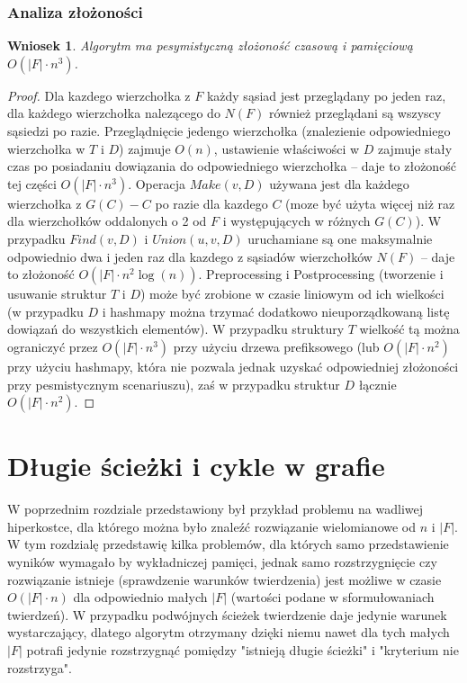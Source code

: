 \documentclass{pracamgr}
\newtheorem{corollary}[theorem]{Wniosek}
\begin{document}
   \subsection{Analiza złożoności}
   \begin{corollary}\label{zlozonosc lokalnej spojnosci}
    Algorytm ma pesymistyczną złożoność czasową i pamięciową $O(|F|\cdot n^3)$.
   \end{corollary}
   \begin{proof}
    Dla kazdego wierzchołka z $F$ każdy sąsiad jest przeglądany po jeden raz, dla każdego wierzchołka nalezącego do $N(F)$ również przeglądani są wszyscy sąsiedzi
    po razie. Przeglądnięcie jedengo wierzchołka (znalezienie odpowiedniego wierzchołka w $T$ i $D$) zajmuje $O(n)$,
    ustawienie właściwości w $D$ zajmuje stały czas po posiadaniu dowiązania do odpowiedniego wierzchołka -- daje to złożoność tej części $O(|F|\cdot n^3)$.\newline
    Operacja $Make(v,D)$ używana jest dla każdego wierzchołka z $G(C)-C$ po razie dla kazdego $C$
    (moze być użyta więcej niż raz dla wierzchołków oddalonych o 2 od $F$ i występujących w różnych $G(C)$).
    W przypadku $Find(v,D)$ i $Union(u,v,D)$ uruchamiane są one maksymalnie odpowiednio dwa i jeden raz dla kazdego z sąsiadów wierzchołków $N(F)$
    -- daje to złożoność $O(|F|\cdot n^2\log(n))$.\newline
    Preprocessing i Postprocessing (tworzenie i usuwanie struktur $T$ i $D$)
    może być zrobione w czasie liniowym od ich wielkości (w przypadku $D$ i hashmapy można trzymać dodatkowo nieuporządkowaną listę dowiązań do wszystkich
    elementów). W przypadku struktury $T$ wielkość tą można ograniczyć przez $O(|F|\cdot n^3)$ przy użyciu drzewa prefiksowego
    (lub $O(|F|\cdot n^2)$ przy użyciu hashmapy, która nie pozwala jednak uzyskać odpowiedniej złożoności przy pesmistycznym scenariuszu),
    zaś w przypadku struktur $D$ łącznie $O(|F|\cdot n^2)$.
   \end{proof}
   
    
 \chapter{Długie ścieżki i cykle w grafie} %
  W poprzednim rozdziale przedstawiony był przykład problemu na wadliwej hiperkostce, dla którego można było znaleźć rozwiązanie wielomianowe od $n$ i $|F|$.
  W tym rozdzialę przedstawię kilka problemów, dla których samo przedstawienie wyników wymagało by wykładniczej pamięci,
  jednak samo rozstrzygnięcie czy rozwiązanie istnieje (sprawdzenie warunków twierdzenia) jest możliwe w czasie
  $O(|F|\cdot n)$ dla odpowiednio małych $|F|$ (wartości podane w sformułowaniach twierdzeń).
  W przypadku podwójnych ścieżek twierdzenie daje jedynie warunek wystarczający, dlatego algorytm otrzymany dzięki niemu nawet dla tych małych $|F|$ potrafi
  jedynie rozstrzygnąć pomiędzy "istnieją długie ścieżki" i "kryterium nie rozstrzyga".
\end{document}
